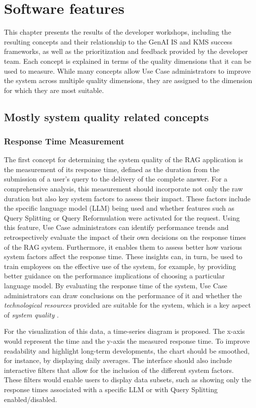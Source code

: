 \documentclass[
	english,
	ruledheaders=section,%
	class=report,%
	thesis={type=bachelor},%
	accentcolor=1b,%
	custommargins=true,%
	marginpar=false,%
	parskip=half-,%
	fontsize=11pt,%
	DIV=14,
]{tudapub}
\begin{document}
\section{Software features}
This chapter presents the results of the developer workshops, including the resulting concepts and their relationship to the GenAI IS \parencite{DeloneMcLean2003ISSuccessTenYearUpdate} and KMS success \parencite{Jennex2006} frameworks, as well as the prioritization and feedback provided by the developer team. Each concept is explained in terms of the quality dimensions that it can be used to measure. While many concepts allow Use Case administrators to improve the system across multiple quality dimensions, they are assigned to the dimension for which they are most suitable.
\subsection{Mostly system quality related concepts}
\subsubsection{Response Time Measurement}
The first concept for determining the system quality of the RAG application is the measurement of its response time, defined as the duration from the submission of a user's query to the delivery of the complete answer. For a comprehensive analysis, this measurement should incorporate not only the raw duration but also key system factors to assess their impact. These factors include the specific language model (LLM) being used and whether features such as Query Splitting or Query Reformulation were activated for the request. Using this feature, Use Case administrators can identify performance trends and retrospectively evaluate the impact of their own decisions on the response times of the RAG system. Furthermore, it enables them to assess better how various system factors affect the response time. These insights can, in turn, be used to train employees on the effective use of the system, for example, by providing better guidance on the performance implications of choosing a particular language model. By evaluating the response time of the system, Use Case administrators can draw conclusions on the performance of it and whether the \textit{technological resources} provided are suitable for the system, which is a key aspect of \textit{system quality} \parencite[p.~56]{Jennex2006}.

For the visualization of this data, a time-series diagram is proposed. The x-axis would represent the time and the y-axis the measured response time. To improve readability and highlight long-term developments, the chart should be smoothed, for instance, by displaying daily averages. The interface should also include interactive filters that allow for the inclusion of the different system factors. These filters would enable users to display data subsets, such as showing only the response times associated with a specific LLM or with Query Splitting enabled/disabled.
\end{document}
